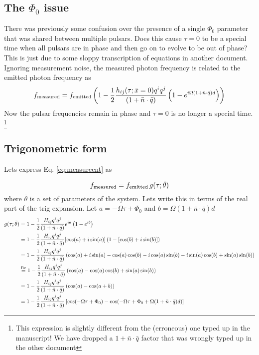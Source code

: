 \documentclass{tufte-handout} %
\begin{document}
\subsection{The $\Phi_0$ issue}
There was previously some confusion over the presence of a single $\Phi_0$ parameter that was shared between multiple pulsars. Does this cause $\tau = 0$ to be a special time when all pulsars are in phase and then go on to evolve to be out of phase? This is just due to some sloppy transcription of equations in another document. Ignoring measurement noise, the measured photon frequency is related to the emitted photon frequency  as
\begin{equation}
	f_{\rm measured} = f_{\rm emitted} \left(1 - \frac{1}{2} \frac{ h_{ij} (\tau; \bar{x}= 0)q^i q^j }{(1 + \bar{n}\cdot \bar{q}) }  \left(1 -e^{i \Omega (1 + \bar{n}\cdot \bar{q})  d}\right) \right)
	\label{eq:measureent}
\end{equation}
Now the pulsar frequencies remain in phase and $\tau=0$ is no longer a special time. \footnote{This expression is slightly different from the (erroneous) one typed up in the manuscript! We have dropped a $1+ \bar{n} \cdot \bar{q}$ factor that was wrongly typed up in the other document}


 \subsection{Trigonometric form}
 
 
 Lets express Eq. \ref{eq:measureent} as
 
 \begin{equation}
 	f_{\rm measured} = f_{\rm emitted} \, g(\tau; \bar{\theta})
 	\label{eq:measureent}
 \end{equation}
where $\bar{\theta}$ is a set of parameters of the system. Lets write this in terms of the real part of the trig expansion. Let $a = -\Omega \tau +\Phi_0$ and $b =\Omega (1 + \bar{n}\cdot \bar{q})  d $
 \begin{align}
	g(\tau; \bar{\theta}) &= 1 - \frac{1}{2} \frac{ H_{ij}q^i q^j }{(1 + \bar{n}\cdot \bar{q}) } e^{ia} \left(1 -e^{i b}\right) \\
	&= 1 - \frac{1}{2} \frac{ H_{ij}q^i q^j }{(1 + \bar{n}\cdot \bar{q}) } [\cos(a) + i \sin(a)] \left(1 -[\cos(b) + i \sin(b)]\right) \\ 
	&= 1 - \frac{1}{2} \frac{ H_{ij}q^i q^j }{(1 + \bar{n}\cdot \bar{q}) } \left( \cos(a) + i \sin(a) - \cos(a) \cos(b) -i \cos(a) \sin(b) -i \sin(a) \cos(b) + \sin(a) \sin(b)\right) \\
	& \stackrel{\rm Re}{=} 1 - \frac{1}{2} \frac{ H_{ij}q^i q^j }{(1 + \bar{n}\cdot \bar{q}) } \left( \cos(a) - \cos(a) \cos(b) + \sin(a) \sin(b)\right) \\
	& = 1 - \frac{1}{2} \frac{ H_{ij}q^i q^j }{(1 + \bar{n}\cdot \bar{q}) } \left( \cos(a) - \cos(a + b) \right) \\
	& = 1 - \frac{1}{2} \frac{ H_{ij}q^i q^j }{(1 + \bar{n}\cdot \bar{q}) } \left[ \cos(-\Omega \tau +\Phi_0) - \cos(-\Omega \tau +\Phi_0 + \Omega (1 + \bar{n}\cdot \bar{q})  d) \right]
\end{align}
\end{document}

